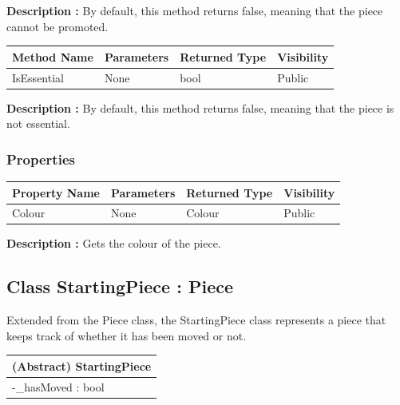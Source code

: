 \documentclass[12pt]{article}
\begin{document}
    \textbf{Description :} By default, this method returns false, meaning that the piece cannot be promoted.

    \begin{table}[H]
        \begin{tabular}{|l|l|l|l|}
            \hline
            \rowcolor[HTML]{EFEFEF}
            \cellcolor[HTML]{EFEFEF}\textbf{Method Name} & \textbf{Parameters} & \textbf{Returned Type} & \textbf{Visibility} \\ \hline
            IsEssential                                  & None                & bool                   & Public              \\ \hline
        \end{tabular}
    \end{table}

    \textbf{Description :} By default, this method returns false, meaning that the piece is not essential.

    \subsubsection{Properties}

    \begin{table}[H]
        \begin{tabular}{|l|l|l|l|}
            \hline
            \rowcolor[HTML]{EFEFEF}
            \cellcolor[HTML]{EFEFEF}\textbf{Property Name} & \textbf{Parameters} & \textbf{Returned Type} & \textbf{Visibility} \\ \hline
            Colour                                         & None                & Colour                 & Public              \\ \hline
        \end{tabular}
    \end{table}

    \textbf{Description :} Gets the colour of the piece.
    \newpage


    \subsection{Class StartingPiece : Piece}

    Extended from the Piece class, the StartingPiece class represents a piece that keeps track of whether it has been moved or not.

    \begin{table}[H]
        \begin{tabular}{|l|}
            \hline
            \cellcolor[HTML]{C0C0C0}\textbf{(Abstract) StartingPiece} \\ \hline
            \cellcolor[HTML]{EFEFEF}-\_hasMoved : bool                \\ \hline
        \end{tabular}
    \end{table}
\end{document}
